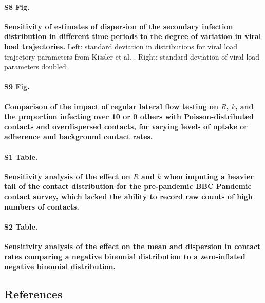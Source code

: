 \documentclass[
  10pt,
  letterpaper,
]{article}
\begin{document}
\paragraph*{S8 Fig.}
\label{fig-s8}
{\textbf{Sensitivity of estimates of dispersion of the secondary
infection distribution in different time periods to the degree of
variation in viral load trajectories.}} Left: standard deviation in
distributions for viral load trajectory parameters from Kissler et al.
\citep{kissler2021}. Right: standard deviation of viral load parameters
doubled.

\paragraph*{S9 Fig.}
\label{fig-s9}
{\textbf{Comparison of the impact of regular lateral flow testing on
\(R\), \(k\), and the proportion infecting over 10 or 0 others with
Poisson-distributed contacts and overdispersed contacts, for varying
levels of uptake or adherence and background contact rates.}}

\paragraph*{S1 Table.}
\label{tbl-s1}
{\textbf{Sensitivity analysis of the effect on \(R\) and \(k\) when
imputing a heavier tail of the contact distribution for the pre-pandemic
BBC Pandemic contact survey, which lacked the ability to record raw
counts of high numbers of contacts.}}

\paragraph*{S2 Table.}
\label{tbl-s2}
{\textbf{Sensitivity analysis of the effect on the mean and dispersion
in contact rates comparing a negative binomial distribution to a
zero-inflated negative binomial distribution.}}

\subsection{References}\label{references}

\renewcommand{\bibsection}{}



\nolinenumbers
\end{document}
